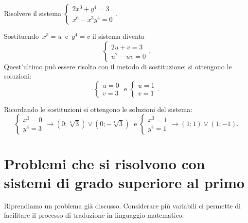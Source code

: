 \begin{exrig}
\begin{esempio}
Risolvere il sistema $\left\{\begin{array}{l}2x^3+y^4=3 \\x^6-x^3y^4=0 \end{array}\right.$.

Sostituendo~$x^{3}=u$~e~$y^{4}=v$ il sistema diventa
\[\left\{\begin{array}{l}2u+v=3 \\u^{2}-uv=0 \end{array}\right..\]
Quest'ultimo può essere risolto con il metodo di sostituzione; si ottengono le soluzioni:
\[\left\{\begin{array}{l}u=0 \\v=3 \end{array}\right.\text{ e }\left\{\begin{array}{l}u=1 \\v=1 \end{array}\right..\]

Ricordando le sostituzioni si ottengono le soluzioni del sistema:
\[\left\{\begin{array}{l}x^{3}=0 \\y^{4}=3\end{array}\right. \rightarrow \left(0;\sqrt[4]{3}\right)\vee\left(0;-\sqrt[4]{3}\right)~\text{ e }\left\{\begin{array}{l}x^{3}=1 \\y^{4}=1\end{array}\right.\rightarrow (1;1)\vee(1;-1).\]
\end{esempio}
\end{exrig}

\section{Problemi che si risolvono con sistemi di grado superiore al primo}

Riprendiamo un problema già discusso. Considerare più variabili ci permette di facilitare il processo di traduzione in linguaggio matematico.

